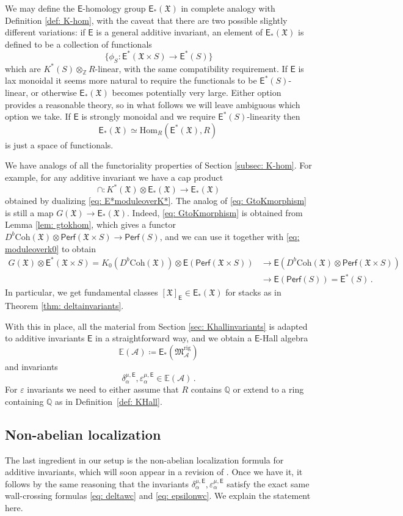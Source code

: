 \documentclass[12pt]{amsart}
\theoremstyle{definition}
\newcommand{\sE}{\mathsf{E}}
\newcommand{\BQ}{{\mathbb{Q}}}
\newcommand{\BZ}{{\mathbb{Z}}}
\newcommand{\CA}{{\mathcal A}}
\newcommand{\1}{\mathbf 1}
\newcommand{\FM}{{\mathfrak{M}}}
\newcommand{\FX}{{\mathfrak{X}}}
\newcommand{\Coh}{\mathrm{Coh}}
\newcommand{\Perf}{\mathsf{Perf}}
\newcommand{\Hom}{\mathrm{Hom}}
\newcommand{\rig}{\mathrm{rig}}
\begin{document}
We may define the $\sE$-homology group $\sE_\ast(\FX)$ in complete analogy with Definition \ref{def: K-hom}, with the caveat that there are two possible slightly different variations: if $\sE$ is a general additive invariant, an element of $\sE_\ast(\FX)$ is defined to be a collection of functionals $$\{\phi_S\colon \sE^\ast(\FX\times S)\to \sE^\ast(S)\}$$ which are $K^\ast(S)\otimes_\BZ R$-linear, with the same compatibility requirement. If $\sE$ is lax monoidal it seems more natural to require the functionals to be $\sE^\ast(S)$-linear, or otherwise $\sE_\ast(\FX)$ becomes potentially very large. Either option provides a reasonable theory, so in what follows we will leave ambiguous which option we take. If $\sE$ is strongly monoidal and we require $\sE^\ast(S)$-linearity then 
\[\sE_\ast(\FX)\simeq \Hom_R(\sE^\ast(\FX), R)\,\]
is just a space of functionals.

We have analogs of all the functoriality properties of Section \ref{subsec: K-hom}. For example, for any additive invariant we have a cap product 
\[\cap \colon K^\ast(\FX)\otimes \sE_\ast(\FX)\to \sE_\ast(\FX)\]
obtained by dualizing \eqref{eq: E*moduleoverK*}. The analog of \eqref{eq: GtoKmorphism} is still a map $G(\FX)\to \sE_\ast(\FX)$. Indeed, \eqref{eq: GtoKmorphism} is obtained from Lemma \ref{lem: gtokhom}, which gives a functor $D^b\Coh(\FX)\otimes \Perf(\FX\times S)\to \Perf(S)$,
and we can use it together with \eqref{eq: moduleoverk0} to obtain
\begin{align*}G(\FX)\otimes \sE^\ast(\FX\times S)=K_0(D^b\Coh(\FX))\otimes \sE(\Perf(\FX\times S)) 
&\to \sE(D^b\Coh(\FX)\otimes \Perf(\FX\times S))\\
&\to \sE(\Perf(S))=\sE^\ast(S)\,.
\end{align*}
In particular, we get fundamental classes $[\FX]_{\sE}\in \sE_\ast(\FX)$ for stacks as in Theorem \ref{thm: deltainvariants}.

With this in place, all the material from Section \ref{sec: Khallinvariants} is adapted to additive invariants $\sE$ in a straightforward way, and we obtain a $\sE$-Hall algebra
\[\mathbb E(\CA)\coloneqq \sE_\ast(\FM_{\CA}^\rig)\]
and invariants
\[\delta_{\alpha}^{\mu, \sE}, \varepsilon_{\alpha}^{\mu, \sE}\in \mathbb E(\CA)\,.\]
For $\varepsilon$ invariants we need to either assume that $R$ contains $\BQ$ or extend to a ring containing $\BQ$ as in Definition~\ref{def: KHall}.

\subsection{Non-abelian localization}
The last ingredient in our setup is the non-abelian localization formula for additive invariants, which will soon appear in a revision of \cite{HLNAL}. Once we have it, it follows by the same reasoning that the invariants $\delta^{\mu, \sE}_\alpha, \varepsilon^{\mu, \sE}_\alpha$ satisfy the exact same wall-crossing formulas \eqref{eq: deltawc} and \eqref{eq: epsilonwc}. We explain the statement here.
\end{document}
